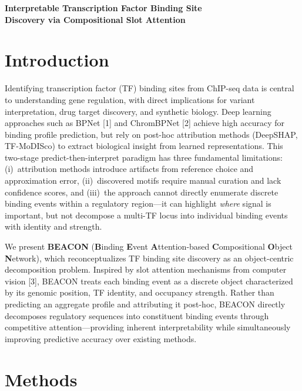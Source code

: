\documentclass[10pt]{article}
\begin{document}
\begin{center}
{\Large\bfseries Interpretable Transcription Factor Binding Site\\[2pt]
Discovery via Compositional Slot Attention}
\vspace{5pt}
\end{center}

\section*{Introduction}

Identifying transcription factor (TF) binding sites from ChIP-seq data is central to understanding gene regulation, with direct implications for variant interpretation, drug target discovery, and synthetic biology. Deep learning approaches such as BPNet [1] and ChromBPNet [2] achieve high accuracy for binding profile prediction, but rely on post-hoc attribution methods (DeepSHAP, TF-MoDISco) to extract biological insight from learned representations. This two-stage predict-then-interpret paradigm has three fundamental limitations: (i)~attribution methods introduce artifacts from reference choice and approximation error, (ii)~discovered motifs require manual curation and lack confidence scores, and (iii)~the approach cannot directly enumerate discrete binding events within a regulatory region---it can highlight \emph{where} signal is important, but not decompose a multi-TF locus into individual binding events with identity and strength.

We present \textbf{BEACON} (\textbf{B}inding \textbf{E}vent \textbf{A}ttention-based \textbf{C}ompositional \textbf{O}bject \textbf{N}etwork), which reconceptualizes TF binding site discovery as an object-centric decomposition problem. Inspired by slot attention mechanisms from computer vision [3], BEACON treats each binding event as a discrete object characterized by its genomic position, TF identity, and occupancy strength. Rather than predicting an aggregate profile and attributing it post-hoc, BEACON directly decomposes regulatory sequences into constituent binding events through competitive attention---providing inherent interpretability while simultaneously improving predictive accuracy over existing methods.

\section*{Methods}
\end{document}
